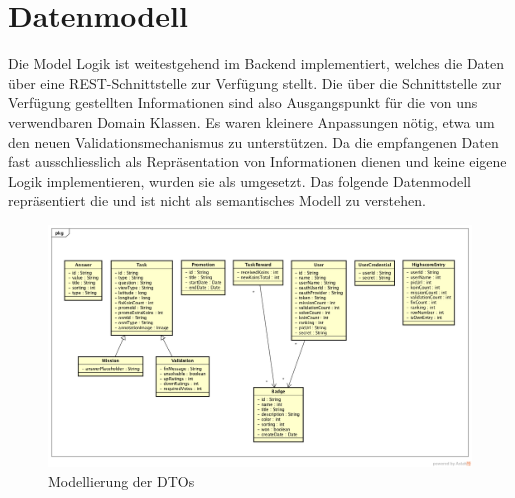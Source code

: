 \label{pd-datenmodell}
\section{Datenmodell}
Die Model Logik ist weitestgehend im \gls{Backend} implementiert, welches die Daten über eine \gls{REST}-Schnittstelle zur Verfügung stellt.
Die über die Schnittstelle zur Verfügung gestellten Informationen sind also Ausgangspunkt für die von uns verwendbaren Domain Klassen.
Es waren kleinere Anpassungen nötig, etwa um den neuen Validationsmechanismus zu unterstützen.
Da die empfangenen Daten fast ausschliesslich als Repräsentation von Informationen dienen und keine eigene Logik implementieren, wurden sie als  umgesetzt.\newline
Das folgende Datenmodell repräsentiert die  und ist nicht als semantisches Modell zu verstehen.\newline
\begin{figure}[H]
 	\centering
 	\includegraphics[width=\textwidth]{images/projektdokumentation/Datenmodell.png}
 	\caption{Modellierung der DTOs}
 	\label{image-data-model}
\end{figure}
